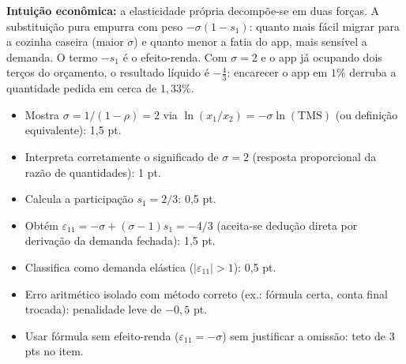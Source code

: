 \begin{solucao}
\textbf{Intuição econômica:} a elasticidade própria decompõe-se em duas forças. A substituição pura empurra com peso $-\sigma(1-s_1)$: quanto mais fácil migrar para a cozinha caseira (maior $\sigma$) e quanto menor a fatia do app, mais sensível a demanda. O termo $-s_1$ é o efeito-renda. Com $\sigma=2$ e o app já ocupando dois terços do orçamento, o resultado líquido é $-\tfrac43$: encarecer o app em $1\%$ derruba a quantidade pedida em cerca de $1{,}33\%$.
\rubricalabel
\begin{itemize}
\item Mostra $\sigma=1/(1-\rho)=2$ via $\ln(x_1/x_2)=-\sigma\ln(\text{TMS})$ (ou definição equivalente): 1{,}5 pt.
\item Interpreta corretamente o significado de $\sigma=2$ (resposta proporcional da razão de quantidades): 1 pt.
\item Calcula a participação $s_1=2/3$: 0{,}5 pt.
\item Obtém $\varepsilon_{11}=-\sigma+(\sigma-1)s_1=-4/3$ (aceita-se dedução direta por derivação da demanda fechada): 1{,}5 pt.
\item Classifica como demanda elástica ($|\varepsilon_{11}|>1$): 0{,}5 pt.
\item Erro aritmético isolado com método correto (ex.: fórmula certa, conta final trocada): penalidade leve de $-0{,}5$ pt.
\item Usar fórmula sem efeito-renda ($\varepsilon_{11}=-\sigma$) sem justificar a omissão: teto de 3 pts no item.
\end{itemize}
\end{solucao}

